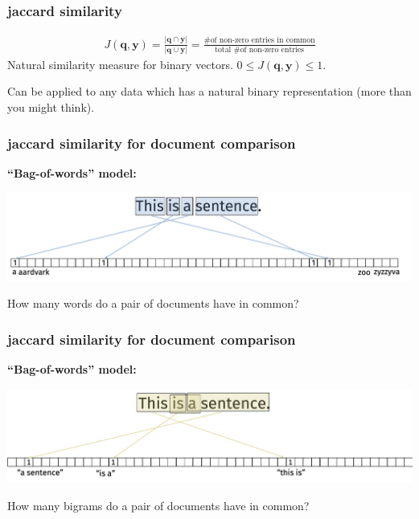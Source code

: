 \documentclass[handout,compress]{beamer}
\newcommand{\bv}[1]{\mathbf{#1}}
\begin{document}
\begin{frame}
	\frametitle{jaccard similarity}
	\begin{definition}
		\begin{align*}
			J(\bv{q},\bv{y}) = \frac{|\bv{q} \cap \bv{y}|}{|\bv{q} \cup \bv{y}|} = \frac{\text{\# of non-zero entries in common}}{\text{total \# of non-zero entries}}
		\end{align*}
		Natural similarity measure for binary vectors. $0\leq J(\bv{q},\bv{y})\leq 1$.
	\end{definition}

	Can be applied to any data which has a natural binary representation (more than you might think). 
\end{frame}

\begin{frame}
	\frametitle{jaccard similarity for document comparison}
	\textbf{``Bag-of-words'' model:}
	\begin{center}
		\includegraphics[width=.95\textwidth]{bagofwords.png}
	\end{center}
	
	How many words do a pair of documents have in common?
\end{frame}

\begin{frame}
	\frametitle{jaccard similarity for document comparison}
	\textbf{``Bag-of-words'' model:}
	\begin{center}
		\includegraphics[width=.95\textwidth]{bigrams.png}
	\end{center}
	
	How many bigrams do a pair of documents have in common?
\end{frame}

%		
%		
\end{document}
